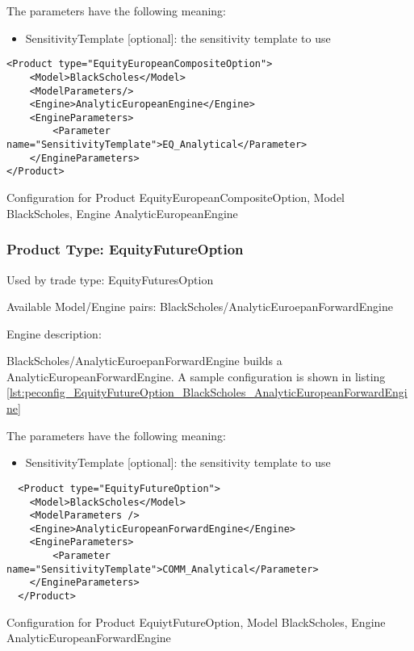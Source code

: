 The parameters have the following meaning:

\begin{itemize}
\item SensitivityTemplate [optional]: the sensitivity template to use 
\end{itemize}

\begin{longlisting}
\begin{verbatim}
<Product type="EquityEuropeanCompositeOption">
    <Model>BlackScholes</Model>
    <ModelParameters/>
    <Engine>AnalyticEuropeanEngine</Engine>
    <EngineParameters>
        <Parameter name="SensitivityTemplate">EQ_Analytical</Parameter>
    </EngineParameters>
</Product>
\end{verbatim}
\caption{Configuration for Product EquityEuropeanCompositeOption, Model BlackScholes, Engine AnalyticEuropeanEngine}
\label{lst:peconfig_EquityEuropeanCompositeOption_BlackScholes_AnalyticEuropeanEngine}
\end{longlisting}

\subsubsection{Product Type: EquityFutureOption}

Used by trade type: EquityFuturesOption

Available Model/Engine pairs: BlackScholes/AnalyticEuroepanForwardEngine

Engine description:

BlackScholes/AnalyticEuroepanForwardEngine builds a AnalyticEuropeanForwardEngine. A sample configuration is shown in
listing \ref{lst:peconfig_EquityFutureOption_BlackScholes_AnalyticEuropeanForwardEngine}

The parameters have the following meaning:

\begin{itemize}
\item SensitivityTemplate [optional]: the sensitivity template to use 
\end{itemize}

\begin{longlisting}
\begin{verbatim}
  <Product type="EquityFutureOption">
    <Model>BlackScholes</Model>
    <ModelParameters />
    <Engine>AnalyticEuropeanForwardEngine</Engine>
    <EngineParameters>
        <Parameter name="SensitivityTemplate">COMM_Analytical</Parameter>
    </EngineParameters>
  </Product>
\end{verbatim}
\caption{Configuration for Product EquiytFutureOption, Model BlackScholes, Engine AnalyticEuropeanForwardEngine}
\label{lst:peconfig_EquityFutureOption_BlackScholes_AnalyticEuropeanForwardEngine}
\end{longlisting}

